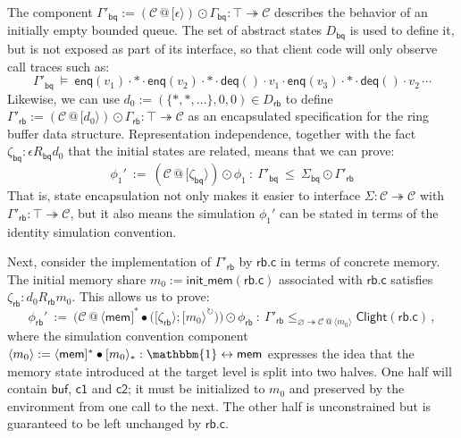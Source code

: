 \documentclass[acmsmall,screen,review,anonymous]{acmart}
\newcommand{\kw}[1]{\ensuremath{ \mathsf{#1} }}
\begin{document}


\begin{example} %
The component
$\Gamma'_\kw{bq} :=
 (\mathcal{C} \mathbin@ [\epsilon\rangle) \odot \Gamma_\kw{bq} :
 \top \twoheadrightarrow \mathcal{C}$
describes the behavior of an initially empty bounded queue.
The set of abstract states $D_\kw{bq}$ is used to define it,
but is not exposed as part of its interface,
so that client code will only observe call traces such as:
\[
  \Gamma'_\kw{bq} \: \vDash \:
    \kw{enq}(v_1) \cdot
    {*} \cdot
    \kw{enq}(v_2) \cdot
    {*} \cdot
    \kw{deq}() \cdot
    v_1 \cdot
    \kw{enq}(v_3) \cdot
    {*} \cdot
    \kw{deq}() \cdot
    v_2 \, \cdots
\]
Likewise,
we can use
$d_0 := (\{{*},{*},\ldots\}, 0, 0) \in D_\kw{rb}$
to define
$\Gamma'_\kw{rb} :=
 (\mathcal{C} \mathbin@ [d_0\rangle) \odot \Gamma_\kw{rb} :
 \top \twoheadrightarrow \mathcal{C}$
as an encapsulated specification for
the ring buffer data structure.
Representation independence, together with the fact
$\zeta_\kw{bq} : \epsilon \mathbin{R_\kw{bq}} d_0$
that the initial states are related,
means that we can prove:
\[
  \phi_1' \: := \:
  (\mathcal{C} \mathbin@ [\zeta_\kw{bq}\rangle) \odot \phi_1
  \: : \:
  \Gamma'_\kw{bq} \: \le \: \Sigma_\kw{bq} \odot \Gamma'_\kw{rb}
\]
That is,
state encapsulation not only makes it easier
to interface $\Sigma : \mathcal{C} \twoheadrightarrow \mathcal{C}$
with $\Gamma'_\kw{rb} : \top \twoheadrightarrow \mathcal{C}$,
but it also means the simulation
$\phi_1'$ can be stated in terms of the identity simulation convention.

Next, consider the implementation
of $\Gamma'_\kw{rb}$
by $\kw{rb.c}$
in terms of concrete memory.
The initial memory share $m_0 := \kw{init\_mem}(\kw{rb.c})$
associated with $\kw{rb.c}$ satisfies
$\zeta_\kw{rb} : d_0 \mathrel{R_\kw{rb}} m_0$.
This allows us to prove:
\[
  \phi_\kw{rb}' \: := \:
    \Big(
      \mathcal{C} \mathbin@
      \langle \kw{mem} ]^* \bullet
      \big(
        [\zeta_\kw{rb} \rangle \mathbin; [m_0\rangle^\circlearrowright
      \big)
    \Big) \odot \phi_\kw{rb}
  \: : \:
  \Gamma'_\kw{rb}
    \le_{\varnothing \twoheadrightarrow
      \mathcal{C} \mathbin@
        \langle m_0 \rangle}
    \kw{Clight}(\kw{rb.c})
  \,,
\]
where the simulation convention component
$\langle m_0 \rangle :=
 \langle \kw{mem} ]^* \bullet [m_0\rangle_* :
 \mathbbm{1} \leftrightarrow \kw{mem}$
expresses the idea that
the memory state introduced at the target level is split into two halves.
One half will contain $\kw{buf}$, $\kw{c1}$ and $\kw{c2}$;
it must be initialized to $m_0$
and preserved by the environment from one call to the next.
The other half is unconstrained
but is guaranteed to be left unchanged by $\kw{rb.c}$.


\end{example}
\end{document}
